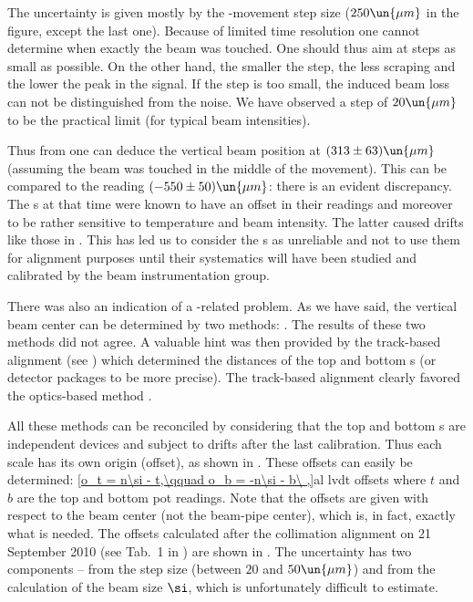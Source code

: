 The uncertainty is given mostly by the -movement step size ($250\un{\mu m}$ in the figure, except the last one). Because of limited time resolution one cannot determine when exactly the beam was touched. One should thus aim at steps as small as possible. On the other hand, the smaller the step, the less scraping and the lower the peak in the  signal. If the step is too small, the induced beam loss can not be distinguished from the noise. We have observed a step of $20\un{\mu m}$ to be the practical limit (for typical beam intensities).

Thus from  one can deduce the vertical beam position at $(313\pm 63)\un{\mu m}$ (assuming the beam was touched in the middle of the movement). This can be compared to the  reading $(-550\pm50)\un{\mu m}$: there is an evident discrepancy. The s at that time were known to have an offset in their readings and moreover to be rather sensitive to temperature and beam intensity. The latter caused drifts like those in . This has led us to consider the s as unreliable and not to use them for alignment purposes until their systematics will have been studied and calibrated by the beam instrumentation group.

There was also an indication of a -related problem. As we have said, the vertical beam center can be determined by two methods: . The results of these two methods did not agree. A valuable hint was then provided by the track-based alignment (see ) which determined the distances of the top and bottom s (or detector packages to be more precise). The track-based alignment clearly favored the optics-based method .



All these methods can be reconciled by considering that the top and bottom s are independent devices and subject to drifts after the last calibration. Thus each  scale has its own origin (offset), as shown in . These offsets can easily be determined:
\eqref{o_t = n\si - t,\qquad o_b = -n\si - b\ ,}{al lvdt offsets}
where $t$ and $b$ are the top and bottom pot  readings. Note that the offsets are given with respect to the beam center (not the beam-pipe center), which is, in fact, exactly what is needed. The offsets calculated after the collimation alignment on 21 September 2010 (see Tab.~1 in ) are shown in . The uncertainty has two components -- from the step size (between $20$ and $50\un{\mu m}$) and from the calculation of the beam size $\si$, which is unfortunately difficult to estimate.

